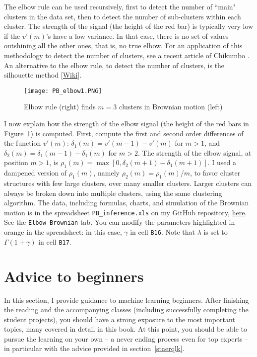 \documentclass[oneside,10pt]{book}
\begin{document}
The elbow rule can be used recursively, first to detect the number of ``main" clusters in the data set, then to detect the number of sub-clusters within each cluster. The strength of the signal (the height of the red bar) is typically very low if the $v'(m)$'s have a low variance. In that case, there is no set of values outshining all the other ones, that is, no true elbow. For an application of this methodology to detect the number of clusters, see a recent article of Chikumbo \cite{vg5}. An alternative to the elbow rule, to detect the number of clusters,
is the silhouette method [\href{https://en.wikipedia.org/wiki/Silhouette_(clustering)}{Wiki}].

\begin{figure}[H]
\centering
\texttt{[image: PB\_elbow1.PNG]}
\caption{Elbow rule (right) finds $m = 3$ clusters in Brownian motion (left)}
\label{fig:pbelbow1}
\end{figure}

I now explain how the strength of the elbow signal (the height of the red bars in Figure~\ref{fig:pbelbow1}) is computed. First, compute the first and second order differences of the function $v'(m)$:
$\delta_1(m)=v'(m-1)-v'(m)$ for $m>1$, and $\delta_2(m)=\delta_1(m-1)-\delta_1(m)$ for $m>2$. The strength of the elbow signal, at position $m>1$,
is  $\rho_1(m)=\max[0,\delta_2(m+1)-\delta_1(m+1)]$. I used a dampened version of $\rho_1(m)$, namely $\rho_2(m)=\rho_1(m)/m$, to favor cluster
structures with few large clusters, over many smaller clusters. Larger clusters can always be broken down into multiple clusters, using the same clustering algorithm.
The data, including formulas, charts, and simulation of the Brownian motion is in the spreadsheet
 \texttt{PB\_inference.xls} on my GitHub repository, \href{https://github.com/VincentGranville/Point-Processes/tree/main/Spreadsheets}{here}. See the \texttt{Elbow\_Brownian} tab.  You can modify the parameters highlighted in orange in the spreadsheet: in this case, $\gamma$ in cell
\texttt{B16}. Note that
$\lambda$ is set to $\Gamma(1+\gamma)$ in cell \texttt{B17}.

\section{Advice to beginners}

In this section, I provide guidance to machine learning beginners. After finishing the reading and the accompanying classes (including successfully completing the student projects), you should have a strong exposure to the most important topics, many covered in detail in this book. At this point, you should be able to pursue the learning on your own -- a never ending process even for top experts --  in particular with the advice provided in section~\ref{staerqlk}.
\end{document}
